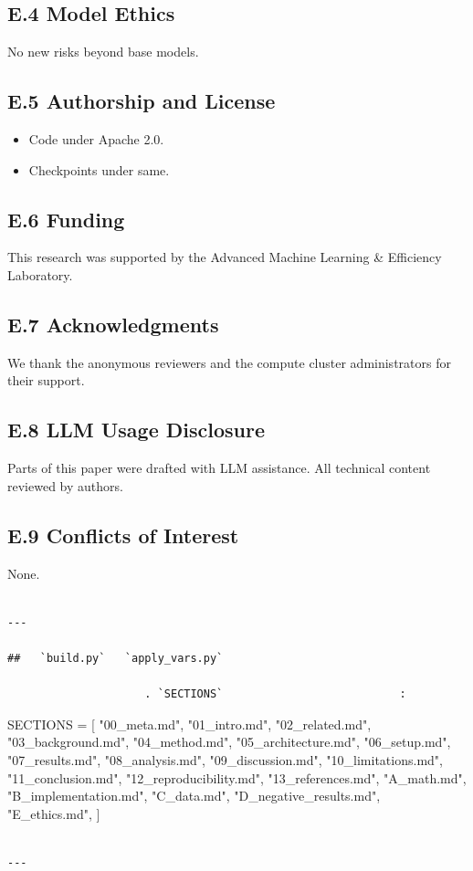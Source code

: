 \subsection{E.4 Model Ethics}

No new risks beyond base models.

\subsection{E.5 Authorship and License}

\begin{itemize}
\item Code under Apache 2.0.
\item Checkpoints under same.

\end{itemize}
\subsection{E.6 Funding}

This research was supported by the Advanced Machine Learning \& Efficiency Laboratory.

\subsection{E.7 Acknowledgments}

We thank the anonymous reviewers and the compute cluster administrators for their support.

\subsection{E.8 LLM Usage Disclosure}

Parts of this paper were drafted with LLM assistance. All technical content 
reviewed by authors.

\subsection{E.9 Conflicts of Interest}

None.
\begin{lstlisting}

---

##   `build.py`   `apply_vars.py`

                     . `SECTIONS`                           :

\end{lstlisting}
SECTIONS = [
    "00\_meta.md", "01\_intro.md", "02\_related.md", "03\_background.md",
    "04\_method.md", "05\_architecture.md", "06\_setup.md", "07\_results.md",
    "08\_analysis.md", "09\_discussion.md", "10\_limitations.md",
    "11\_conclusion.md", "12\_reproducibility.md", "13\_references.md",
    "A\_math.md", "B\_implementation.md", "C\_data.md",
    "D\_negative\_results.md", "E\_ethics.md",
]
\begin{lstlisting}

---
\end{lstlisting}